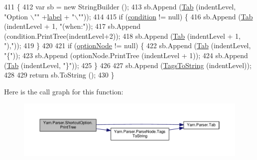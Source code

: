 \begin{DoxyCode}
411             \{
412                 var sb = \textcolor{keyword}{new} StringBuilder ();
413                 sb.Append (\hyperlink{a00151_aa8fa36b46de12a1c561d77b99c4b9ae3}{Tab} (indentLevel, \textcolor{stringliteral}{"Option \(\backslash\)""} +\hyperlink{a00161_ab43ec731479a56891389f6ece87f5f62}{label} + \textcolor{stringliteral}{"\(\backslash\)""}));
414 
415                 \textcolor{keywordflow}{if} (\hyperlink{a00161_a31ece7f65af1e43961b68ba0275cdfaf}{condition} != null) \{
416                     sb.Append (\hyperlink{a00151_aa8fa36b46de12a1c561d77b99c4b9ae3}{Tab} (indentLevel + 1, \textcolor{stringliteral}{"(when:"}));
417                     sb.Append (condition.PrintTree(indentLevel+2));
418                     sb.Append (\hyperlink{a00151_aa8fa36b46de12a1c561d77b99c4b9ae3}{Tab} (indentLevel + 1, \textcolor{stringliteral}{"),"}));
419                 \}
420 
421                 \textcolor{keywordflow}{if} (\hyperlink{a00161_a33d667370031f58b054b79a39891c3f3}{optionNode} != null) \{
422                     sb.Append (\hyperlink{a00151_aa8fa36b46de12a1c561d77b99c4b9ae3}{Tab} (indentLevel, \textcolor{stringliteral}{"\{"}));
423                     sb.Append (optionNode.PrintTree (indentLevel + 1));
424                     sb.Append (\hyperlink{a00151_aa8fa36b46de12a1c561d77b99c4b9ae3}{Tab} (indentLevel, \textcolor{stringliteral}{"\}"}));
425                 \}
426 
427                 sb.Append (\hyperlink{a00150_a054f36c80d5eeacd569a8859f599af67}{TagsToString} (indentLevel));
428 
429                 \textcolor{keywordflow}{return} sb.ToString ();
430             \}
\end{DoxyCode}


Here is the call graph for this function\-:
\nopagebreak
\begin{figure}[H]
\begin{center}
\leavevmode
\includegraphics[width=350pt]{a00161_a529a2ef1aa6d7226db4ea7f3ea92b8c2_cgraph}
\end{center}
\end{figure}


